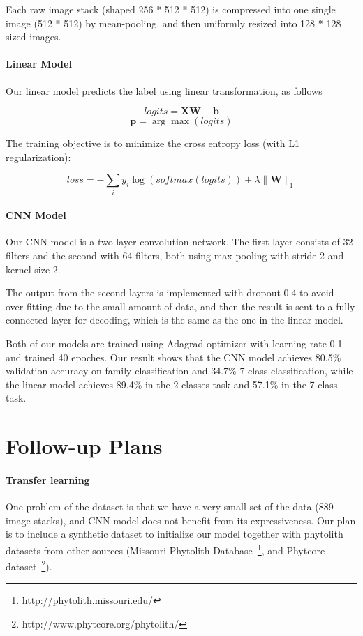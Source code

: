 \documentclass{article}
\begin{document}
Each raw image stack (shaped 256 * 512 * 512) is compressed into one single image (512 * 512) by mean-pooling, and then uniformly resized into 128 * 128 sized images.

\paragraph{Linear Model}

Our linear model predicts the label using linear transformation, as follows

$$\mathit{logits} = \mathbf{X} \mathbf{W} + \mathbf{b}$$
$$\mathbf{p} = \arg\max(\mathit{logits})$$


The training objective is to minimize the cross entropy loss (with L1 regularization):

$$\mathit{loss} = -\sum\limits_{i} y_i\log(\mathit{softmax}(\mathit{logits})) + \lambda \|\mathbf{W}\|_1$$

\paragraph{CNN Model}

Our CNN model is a two layer convolution network. The first layer consists of 32 filters and the second with 64 filters, both using max-pooling with stride 2 and kernel size 2.

The output from the second layers is implemented with dropout 0.4 to avoid over-fitting due to the small amount of data, and then the result is sent to a fully connected layer for decoding, which is the same as the one in the linear model.

\medskip

Both of our models are trained using Adagrad optimizer with learning rate 0.1 and trained 40 epoches.
Our result shows that the CNN model achieves 80.5\% validation accuracy on family classification and 34.7\% 7-class classification, while the linear model achieves 89.4\% in the 2-classes task and 57.1\% in the 7-class task.


\section{Follow-up Plans}

\paragraph{Transfer learning} One problem of the dataset is that we have a very small set of the data (889 image stacks), and CNN model does not benefit from its expressiveness. Our plan is to include a synthetic dataset to initialize our model together with phytolith datasets from other sources (Missouri Phytolith Database~\footnote{http://phytolith.missouri.edu/}, and Phytcore dataset~\footnote{http://www.phytcore.org/phytolith/}).
\end{document}
